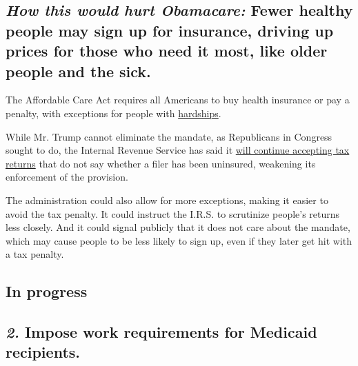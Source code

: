\hypertarget{how-this-would-hurt-obamacare-fewer-healthy-people-may-sign-up-for-insurance-driving-up-prices-for-those-who-need-it-most-like-older-people-and-the-sick}{%
\subsection{\texorpdfstring{\emph{How this would hurt Obamacare:} Fewer
healthy people may sign up for insurance, driving up prices for those
who need it most, like older people and the
sick.}{How this would hurt Obamacare: Fewer healthy people may sign up for insurance, driving up prices for those who need it most, like older people and the sick.}}\label{how-this-would-hurt-obamacare-fewer-healthy-people-may-sign-up-for-insurance-driving-up-prices-for-those-who-need-it-most-like-older-people-and-the-sick}}

The Affordable Care Act requires all Americans to buy health insurance
or pay a penalty, with exceptions for people with
\href{https://www.healthcare.gov/glossary/hardship-exemption/}{hardships}.

While Mr. Trump cannot eliminate the mandate, as Republicans in Congress
sought to do, the Internal Revenue Service has said it
\href{https://www.nytimes3xbfgragh.onion/2017/02/15/us/politics/affordable-care-act-obamacare-trump.html}{will
continue accepting tax returns} that do not say whether a filer has been
uninsured, weakening its enforcement of the provision.

The administration could also allow for more exceptions, making it
easier to avoid the tax penalty. It could instruct the I.R.S. to
scrutinize people's returns less closely. And it could signal publicly
that it does not care about the mandate, which may cause people to be
less likely to sign up, even if they later get hit with a tax penalty.

\hypertarget{in-progress-1}{%
\subsection{In progress}\label{in-progress-1}}

\hypertarget{2-impose-work-requirements-for-medicaid-recipients}{%
\subsection{\texorpdfstring{\emph{\textbf{2.}} \textbf{Impose work
requirements for Medicaid
recipients.}}{2. Impose work requirements for Medicaid recipients.}}\label{2-impose-work-requirements-for-medicaid-recipients}}

